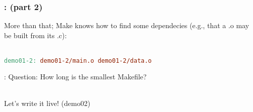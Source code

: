 \begin{frame}[fragile]
    \frametitle{\secname: \small\subsecname (part 2)\normalsize}

    More than that; Make knows how to find some dependecies (e.g., that a .o may be built from its .c): \\~\\

    \begin{lstlisting}[language=make]
demo01-2: demo01-2/main.o demo01-2/data.o
    \end{lstlisting}
\end{frame}

\begin{frame}{\secname: \small\subsecname\normalsize}
    Question: How long is the smallest Makefile? \\~\\ \pause

    Let's write it live! (demo02)

\end{frame}
